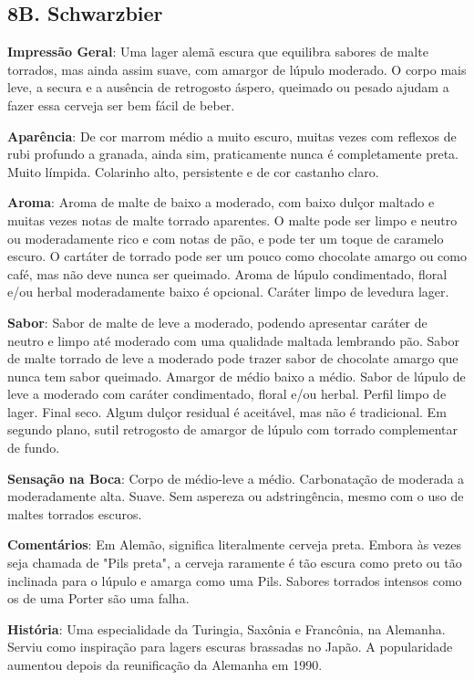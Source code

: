 \subsection*{8B. Schwarzbier}
\textbf{Impressão Geral}: Uma lager alemã escura que equilibra sabores de malte torrados, mas ainda assim suave, com amargor de lúpulo moderado. O corpo mais leve, a secura e a ausência de retrogosto áspero, queimado ou pesado ajudam a fazer essa cerveja ser bem fácil de beber.

\textbf{Aparência}: De cor marrom médio a muito escuro, muitas vezes com reflexos de rubi profundo a granada, ainda sim, praticamente nunca é completamente preta. Muito límpida. Colarinho alto, persistente e de cor castanho claro.

\textbf{Aroma}: Aroma de malte de baixo a moderado, com baixo dulçor maltado e muitas vezes notas de malte torrado aparentes. O malte pode ser limpo e neutro ou moderadamente rico e com notas de pão, e pode ter um toque de caramelo escuro. O cartáter de torrado pode ser um pouco como chocolate amargo ou como café, mas não deve nunca ser queimado. Aroma de lúpulo condimentado, floral e/ou herbal moderadamente baixo é opcional. Caráter limpo de levedura lager.

\textbf{Sabor}: Sabor de malte de leve a moderado, podendo apresentar caráter de neutro e limpo até moderado com uma qualidade maltada lembrando pão. Sabor de malte torrado de leve a moderado pode trazer sabor de chocolate amargo que nunca tem sabor queimado. Amargor de médio baixo a médio. Sabor de lúpulo de leve a moderado com caráter condimentado, floral e/ou herbal. Perfil limpo de lager. Final seco. Algum dulçor residual é aceitável, mas não é tradicional. Em segundo plano, sutil retrogosto de amargor de lúpulo com torrado complementar de fundo.

\textbf{Sensação na Boca}: Corpo de médio-leve a médio. Carbonatação de moderada a moderadamente alta. Suave. Sem aspereza ou adstringência, mesmo com o uso de maltes torrados escuros.

\textbf{Comentários}: Em Alemão, significa literalmente cerveja preta. Embora às vezes seja chamada de "Pils preta", a cerveja raramente é tão escura como preto ou tão inclinada para o lúpulo e amarga como uma Pils. Sabores torrados intensos como os de uma Porter são uma falha.

\textbf{História}: Uma especialidade da Turingia, Saxônia e Francônia, na Alemanha. Serviu como inspiração para lagers escuras brassadas no Japão. A popularidade aumentou depois da reunificação da Alemanha em 1990.

